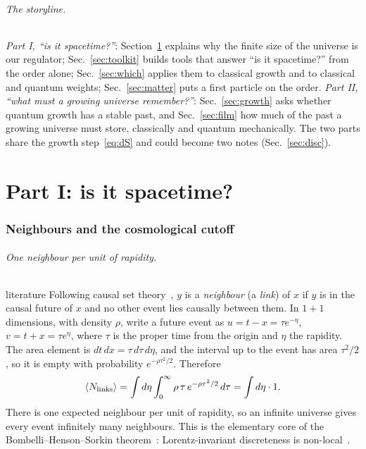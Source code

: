 \documentclass[11pt,a4paper]{article}
\newcommand{\tagbox}[2]{\textsf{\scriptsize\colorbox{#1!12}{\textcolor{#1!70!black}{#2}}}}
\newcommand{\lit}{\tagbox{blue}{literature}}
\begin{document}
\paragraph{The storyline.} \emph{Part I, ``is it spacetime?''}: Section~\ref{sec:cutoff} explains why the finite size of the universe is our regulator; Sec.~\ref{sec:toolkit} builds tools that answer ``is it spacetime?'' from the order alone; Sec.~\ref{sec:which} applies them to classical growth and to classical and quantum weights; Sec.~\ref{sec:matter} puts a first particle on the order. \emph{Part II, ``what must a growing universe remember?''}: Sec.~\ref{sec:growth} asks whether quantum growth has a stable past, and Sec.~\ref{sec:film} how much of the past a growing universe must store, classically and quantum mechanically. The two parts share the growth step~\eqref{eq:dS} and could become two notes (Sec.~\ref{sec:disc}).

\part*{Part I: is it spacetime?}
\section{Neighbours and the cosmological cutoff}\label{sec:cutoff}
\paragraph{One neighbour per unit of rapidity.} \lit{} Following causal set theory~\cite{BLMS87,Surya19}, $y$ is a \emph{neighbour} (a \emph{link}) of $x$ if $y$ is in the causal future of $x$ and no other event lies causally between them. In $1+1$ dimensions, with density $\rho$, write a future event as $u=t-x=\tau e^{-\eta}$, $v=t+x=\tau e^{\eta}$, where $\tau$ is the proper time from the origin and $\eta$ the rapidity. The area element is $dt\,dx=\tau\,d\tau\,d\eta$, and the interval up to the event has area $\tau^2/2$, so it is empty with probability $e^{-\rho\tau^2/2}$. Therefore
\begin{equation}
\langle N_{\rm links}\rangle=\int d\eta\int_0^\infty \rho\,\tau\,e^{-\rho\tau^2/2}\,d\tau=\int d\eta\cdot 1 .
\label{eq:onepereta}
\end{equation}
There is one expected neighbour per unit of rapidity, so an infinite universe gives every event infinitely many neighbours. This is the elementary core of the Bombelli--Henson--Sorkin theorem~\cite{BHS06}: Lorentz-invariant discreteness is non-local~\cite{Sorkin07}.
\end{document}
